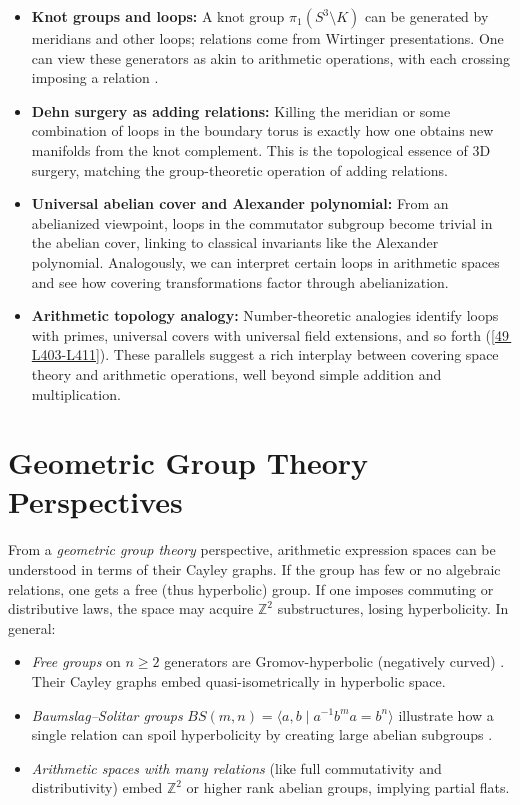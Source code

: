 \documentclass[11pt]{article}
\theoremstyle{remark}
\begin{document}
    \begin{itemize}
        \item \textbf{Knot groups and loops:} A knot group $\pi_1(S^3\setminus K)$ can be generated by meridians and other loops; relations come from Wirtinger presentations. One can view these generators as akin to arithmetic operations, with each crossing imposing a relation \cite[{[16\,\textdagger L181-L186]}]{somebib}.
        \item \textbf{Dehn surgery as adding relations:} Killing the meridian or some combination of loops in the boundary torus is exactly how one obtains new manifolds from the knot complement. This is the topological essence of 3D surgery, matching the group-theoretic operation of adding relations.
        \item \textbf{Universal abelian cover and Alexander polynomial:} From an abelianized viewpoint, loops in the commutator subgroup become trivial in the abelian cover, linking to classical invariants like the Alexander polynomial. Analogously, we can interpret certain loops in arithmetic spaces and see how covering transformations factor through abelianization.
        \item \textbf{Arithmetic topology analogy:} Number-theoretic analogies identify loops with primes, universal covers with universal field extensions, and so forth (\href{https://arxiv.org/abs/1010.1881}{[49\,\textdagger L403-L411]}). These parallels suggest a rich interplay between covering space theory and arithmetic operations, well beyond simple addition and multiplication.
    \end{itemize}

    \bigskip

    \section{Geometric Group Theory Perspectives}
    \label{sec:ggt-perspectives}

    From a \emph{geometric group theory} perspective, arithmetic expression spaces can be understood in terms of their Cayley graphs. If the group has few or no algebraic relations, one gets a free (thus hyperbolic) group. If one imposes commuting or distributive laws, the space may acquire $\mathbb{Z}^2$ substructures, losing hyperbolicity. In general:

    \begin{itemize}[leftmargin=2em]
        \item \emph{Free groups} on $n\ge 2$ generators are Gromov-hyperbolic (negatively curved) \cite[{[28\,\textdagger L79-L86]}]{somebib}. Their Cayley graphs embed quasi-isometrically in hyperbolic space.
        \item \emph{Baumslag--Solitar groups} $BS(m,n)=\langle a,b\mid a^{-1}b^ma=b^n\rangle$ illustrate how a single relation can spoil hyperbolicity by creating large abelian subgroups \cite[{[24\,\textdagger L63-L71]}]{somebib}.
        \item \emph{Arithmetic spaces with many relations} (like full commutativity and distributivity) embed $\mathbb{Z}^2$ or higher rank abelian groups, implying partial flats.
    \end{itemize}
\end{document}
